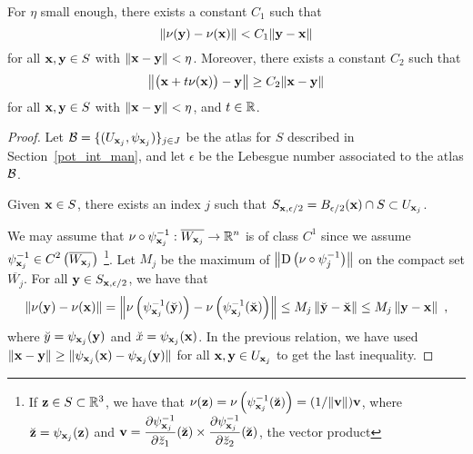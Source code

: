 \begin{lemma} \label{pot_inequ}
For $\eta$ small enough, there exists a constant $C_1$ such that
\[
\left\| \mathbf{\nu}(\mathbf{y}) - \mathbf{\nu}(\mathbf{x}) \right\| < C_1
\|\mathbf{y}-\mathbf{x}\|
\]
for all $\mathbf{x}, \mathbf{y} \in S$ with $\|\mathbf{x} - \mathbf{y}\|<\eta$.
Moreover, there exists a constant $C_2$ such that
\[
\left\| \big(\mathbf{x} + t\mathbf{\nu}(\mathbf{x})\big) - \mathbf{y} \right\|
\geq C_2 \|\mathbf{x} - \mathbf{y}\|
\]
for all $\mathbf{x}, \mathbf{y} \in S$ with $\|\mathbf{x} - \mathbf{y}\|<\eta$,
and $t \in \mathbb{R}$.  
\end{lemma}

\begin{proof}
Let $\displaystyle \mathcal{B} = \{ (U_{\mathbf{x}_j}, \psi_{\mathbf{x}_j}) \}_{j\in J}$
be the atlas for $S$ described in Section~\ref{pot_int_man}, and
let $\epsilon$ be the Lebesgue number associated to the atlas $\mathcal{B}$.

Given $\mathbf{x} \in S$, there exists an index $j$ such that
$\displaystyle S_{\mathbf{x},\epsilon/2} = B_{\epsilon/2}(\mathbf{x})
\cap S \subset U_{\mathbf{x}_j}$.

We may assume that
$\displaystyle \mathbf{\nu} \circ \psi_{\mathbf{x}_j}^{-1}:
\overline{W_{\mathbf{x}_j}} \to \mathbb{R}^n$
is of class $\displaystyle C^1$ since we assume
$\displaystyle \psi_{\mathbf{x}_j}^{-1} \in
C^2\left(\overline{W_{\mathbf{x}_j}}\right)$
\footnote{If $\mathbf{z} \in S \subset \mathbb{R}^3$, we have that
$\displaystyle \mathbf{\nu}(\mathbf{z})
= \mathbf{\nu}\left(\psi_{\mathbf{x}_j}^{-1}(\breve{\mathbf{z}})\right)
= (1/\|\mathbf{v}\|) \mathbf{v}$, where
$\breve{\mathbf{z}} = \psi_{\mathbf{x}_j}(\mathbf{z})$ and
$\displaystyle \mathbf{v} = \frac{\partial{\psi_{\mathbf{x}_j}^{-1}}}{\partial \breve{z}_1}(
\breve{\mathbf{z}})
\times \frac{\partial{\psi_{\mathbf{x}_j}^{-1}}}{\partial \breve{z}_2}(\breve{\mathbf{z}})$,
the vector product}.
Let $M_j$ be the maximum of
$\displaystyle \left\| \operatorname{D} \left(\mathbf{\nu} \circ \psi_j^{-1}\right)\right\|$
on the compact set $\displaystyle \overline{W_j}$.  For all
$\mathbf{y} \in S_{\mathbf{x},\epsilon/2}$, we have that
\[
  \left\| \mathbf{\nu}(\mathbf{y}) - \mathbf{\nu}(\mathbf{x}) \right\|
= \left\| \mathbf{\nu}\left(\psi_{\mathbf{x}_j}^{-1}(\breve{\mathbf{y}})\right) -
 \mathbf{\nu}\left(\psi_{\mathbf{x}_j}^{-1}(\breve{\mathbf{x}})\right) \right\|
\leq M_j \left\| \breve{\mathbf{y}} - \breve{\mathbf{x}} \right\|
\leq M_j \left\| \mathbf{y} - \mathbf{x} \right\| \ ,
\]
where $\breve{y} = \psi_{\mathbf{x}_j}(\mathbf{y})$ and
$\breve{x} = \psi_{\mathbf{x}_j}(\mathbf{x})$.  In the previous relation, we
have used $\displaystyle \|\mathbf{x}-\mathbf{y}\| 
\geq \|\psi_{\mathbf{x}_j}(\mathbf{x}) - \psi_{\mathbf{x}_j}(\mathbf{y})\|$ for all
$\displaystyle \mathbf{x},\mathbf{y} \in U_{\mathbf{x}_j}$ to get the last
inequality.


\end{proof}
